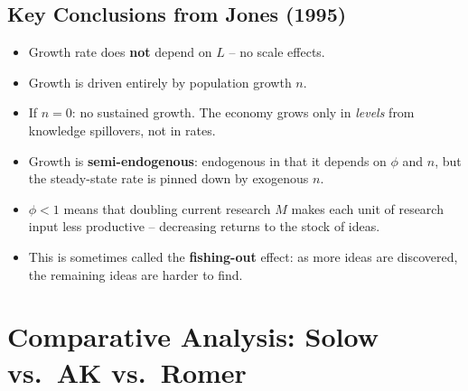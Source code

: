\documentclass[a4paper,11pt]{article}
\begin{document}
\subsection*{Key Conclusions from Jones (1995)}

\begin{itemize}
    \item Growth rate does \textbf{not} depend on $L$ -- no scale effects.
    \item Growth is driven entirely by population growth $n$.
    \item If $n = 0$: no sustained growth. The economy grows only in \emph{levels} from knowledge spillovers, not in rates.
    \item Growth is \textbf{semi-endogenous}: endogenous in that it depends on $\phi$ and $n$, but the steady-state rate is pinned down by exogenous $n$.
    \item $\phi < 1$ means that doubling current research $M$ makes each unit of research input less productive -- decreasing returns to the stock of ideas.
    \item This is sometimes called the \textbf{fishing-out} effect: as more ideas are discovered, the remaining ideas are harder to find.
\end{itemize}

\clearpage

\section{Comparative Analysis: Solow vs.\ AK vs.\ Romer}
\end{document}
